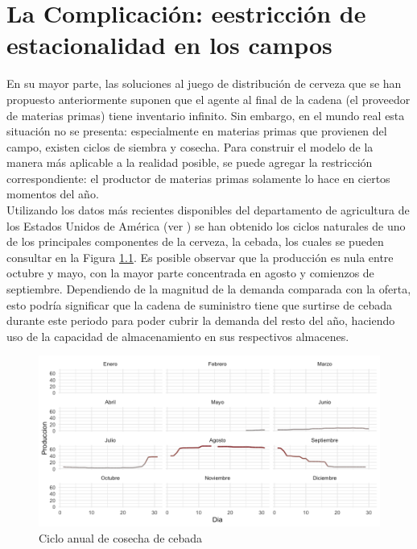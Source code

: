 \chapter{La Complicaci\'on: eestricci\'on de estacionalidad en los campos}

En su mayor parte, las soluciones al juego de distribuci\'on de cerveza que se han propuesto anteriormente suponen que el agente al final de la cadena (el proveedor de materias primas) tiene inventario infinito. Sin embargo, en el mundo real esta situaci\'on no se presenta: especialmente en materias primas que provienen del campo, existen ciclos de siembra y cosecha. Para construir el modelo de la manera m\'as aplicable a la realidad posible, se puede agregar la restricci\'on correspondiente: el productor de materias primas solamente lo hace en ciertos momentos del a\~no.\\

Utilizando los datos m\'as recientes disponibles del departamento de agricultura de los Estados Unidos de Am\'erica (ver \cite{USDA}) se han obtenido los ciclos naturales de uno de los principales componentes de la cerveza, la cebada, los cuales se pueden consultar en la Figura \ref{fields}. Es posible observar que la producci\'on es nula entre octubre y mayo, con la mayor parte concentrada en agosto y comienzos de septiembre. Dependiendo de la magnitud de la demanda comparada con la oferta, esto podr\'ia significar que la cadena de suministro tiene que surtirse de cebada durante este periodo para poder cubrir la demanda del resto del a\~no, haciendo uso de la capacidad de almacenamiento en sus respectivos almacenes.\\

\begin{figure}[ht!]
\caption{Ciclo anual de cosecha de cebada}
\label{fields}
\includegraphics[width=13cm]{tesis_tex/figs/fields_monthly_supply_ggplot.png}
\centering
\end{figure}

